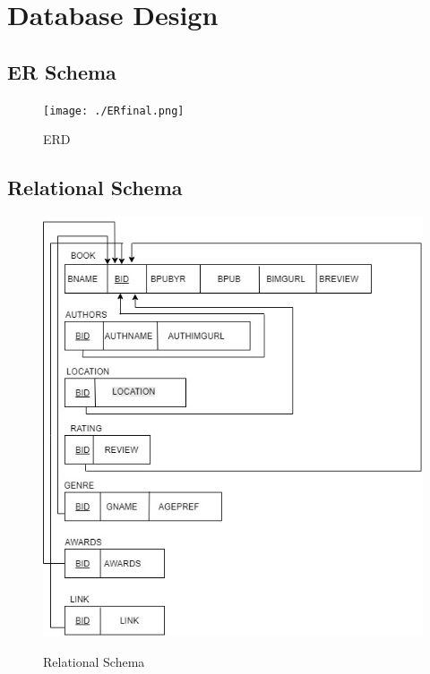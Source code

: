 \chapter{Database Design}
\section{ER Schema}
\begin{figure}[H]
\centering
\caption{ERD}
\texttt{[image: ./ERfinal.png]}
\\[0.2in]
\label{fig:ER diagram}
\end{figure}
\thispagestyle{fancy}

\section{Relational Schema}
\begin{figure}[H]
\centering
\caption{Relational Schema}
\includegraphics[scale=.5]{./tschema.jpg}
\\[0.2in]
\label{fig:Relational Schema}
\end{figure}

\thispagestyle{fancy}